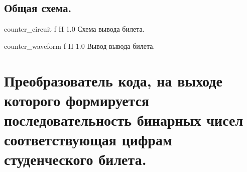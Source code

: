 \documentclass{bmstu}
\begin{document}
	\section{Общая схема.}
	{counter_circuit}
	{f} %
	{H} %
	{1.0\textwidth} %
	{Схема вывода билета.} %

	{counter_waveform}
	{f} %
	{H} %
	{1.0\textwidth} %
	{Вывод вывода билета.} %

	\chapter{Преобразователь кода, на выходе которого формируется
			 последовательность бинарных чисел соответствующая цифрам
			 студенческого билета.}
	
	
	
	
	
\end{document}
